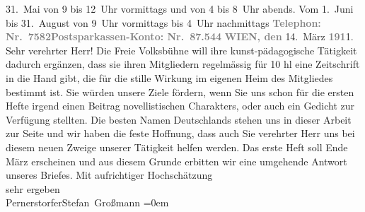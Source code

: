 \begin{ledgroupsized}[t]{13cm}
{{                     31. Mai von 9 bis 12 Uhr vormittags und von 4 bis 8 Uhr abends. Vom 1. Juni bis
                     31. August von 9 Uhr vormittags bis 4 Uhr nachmittags}}\pend
           \pstart
           \textcolor{gray}{\textbf{Telephon: Nr. 7582}}\hfill \textcolor{gray}{\textbf{Postsparkassen-Konto: Nr. 87.544}}\pend
           \pstart
           \raggedleft{}\textcolor{gray}{\textbf{WIEN, den}}{ }14. März \textcolor{gray}{\textbf{191}}1.\pend
           \pstart\center{}Sehr verehrter Herr!\pend\pstart
           Die Freie Volksbühne will ihre kunst-pädagogische
               Tätigkeit dadurch ergänzen, dass sie ihren Mitgliedern regelmässig für 10 hl eine Zeitschrift in die Hand gibt,
               die für die stille Wirkung im eigenen Heim des Mitgliedes bestimmt ist. Sie würden
               unsere Ziele fördern, wenn Sie uns schon für die ersten Hefte irgend einen Beitrag
               novellistischen Charakters, oder auch ein Gedicht zur Verfügung stellten. Die besten
               Namen Deutschlands stehen uns in dieser Arbeit zur Seite und wir haben die feste
               Hoffnung, dass auch Sie verehrter Herr uns bei diesem neuen Zweige unserer Tätigkeit
               helfen werden.\pend
           \pstart
           Das erste Heft soll Ende
                  März erscheinen und aus diesem Grunde erbitten wir eine umgehende Antwort
               unseres Briefes.\pend
           \pstart
           Mit aufrichtiger Hochschätzung{\\[\baselineskip]} sehr ergeben{\\[\baselineskip]}\spacefill\mbox{Pernerstorfer}\hspace*{1.5em}\spacefill\mbox{Stefan Großmann}\pend
           \leftskip=0em{}
         
         \endnumbering{}\end{ledgroupsized}  \newcommand{\dateiname}{L02013}\newcommand{\titel}{Engelbert Pernerstorfer und Stefan Großmann an Arthur Schnitzler, 14. 3. 1911}\newcommand{\editorInnen}{Martin Anton Müller und Gerd-Hermann Susen}
      